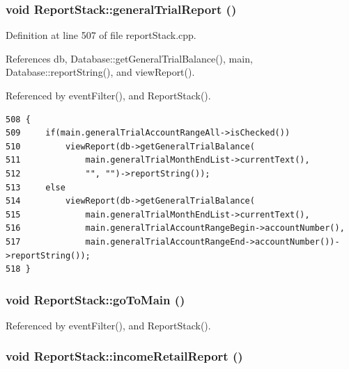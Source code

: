 \hypertarget{classReportStack_k9}{
\subsubsection[generalTrialReport]{\setlength{\rightskip}{0pt plus 5cm}void Report\-Stack::general\-Trial\-Report ()}}
\label{classReportStack_k9}


Definition at line 507 of file report\-Stack.cpp.

References db, Database::get\-General\-Trial\-Balance(), main, Database::report\-String(), and view\-Report().

Referenced by event\-Filter(), and Report\-Stack().

\footnotesize\begin{verbatim}508 {
509     if(main.generalTrialAccountRangeAll->isChecked())
510         viewReport(db->getGeneralTrialBalance(
511             main.generalTrialMonthEndList->currentText(),
512             "", "")->reportString());
513     else
514         viewReport(db->getGeneralTrialBalance(
515             main.generalTrialMonthEndList->currentText(),
516             main.generalTrialAccountRangeBegin->accountNumber(),
517             main.generalTrialAccountRangeEnd->accountNumber())->reportString());
518 }
\end{verbatim}\normalsize 


\hypertarget{classReportStack_l0}{
\subsubsection[goToMain]{\setlength{\rightskip}{0pt plus 5cm}void Report\-Stack::go\-To\-Main ()}}
\label{classReportStack_l0}




Referenced by event\-Filter(), and Report\-Stack().\hypertarget{classReportStack_k13}{
\subsubsection[incomeRetailReport]{\setlength{\rightskip}{0pt plus 5cm}void Report\-Stack::income\-Retail\-Report ()}}
\label{classReportStack_k13}


